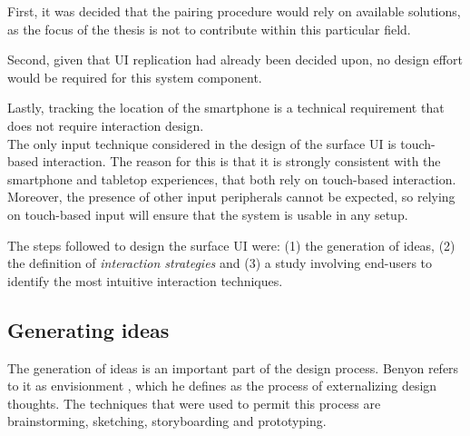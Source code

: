First, it was decided that the pairing procedure would rely on available solutions, as the focus of the thesis is not to contribute within this particular field.

Second, given that UI replication had already been decided upon, no design effort would be required for this system component.

Lastly, tracking the location of the smartphone is a technical requirement that does not require interaction design. %
\\
\linebreak
The only input technique considered in the design of the surface UI is touch-based interaction.
The reason for this is that it is strongly consistent with the smartphone and tabletop experiences, that both rely on touch-based interaction.
Moreover, the presence of other input peripherals cannot be expected, so relying on touch-based input will ensure that the system is usable in any setup.

The steps followed to design the surface UI were: (1) the generation of ideas, (2) the definition of \emph{interaction strategies} and (3) a study involving end-users to identify the most intuitive interaction techniques.


\subsection{Generating ideas}

The generation of ideas is an important part of the design process.
Benyon refers to it as envisionment \citep{Benyon:2010}, which he defines as the process of externalizing design thoughts.
The techniques that were used to permit this process are brainstorming, sketching, storyboarding and prototyping.

